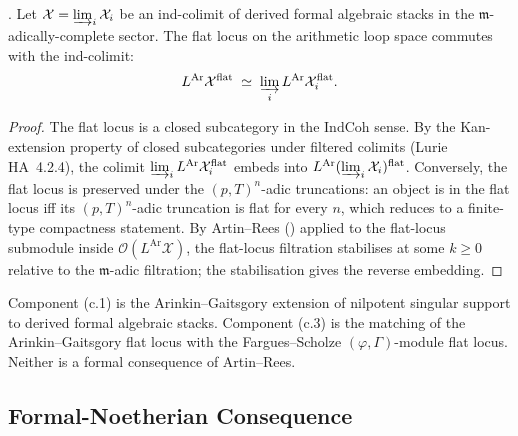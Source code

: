 \begin{proposition}
\label{v4-arith:w5-i:prop:c2-closure}
\ClaimStatusProvedHere. Let \(\mathcal{X}=\varinjlim_{i}\mathcal{X}_{i}\)
be an ind-colimit of derived formal algebraic stacks in the
\(\mathfrak{m}\)-adically-complete sector. The flat locus on the
arithmetic loop space commutes with the ind-colimit:
\[
L^{\mathrm{Ar}}\mathcal{X}^{\mathrm{flat}}\;\simeq\;\varinjlim_{i}L^{\mathrm{Ar}}\mathcal{X}_{i}^{\mathrm{flat}}.
\]
\end{proposition}

\begin{proof}
The flat locus is a closed subcategory in the \(\mathrm{IndCoh}\)
sense. By the Kan-extension property of closed subcategories under
filtered colimits (Lurie HA~4.2.4), the colimit
\(\varinjlim_{i}L^{\mathrm{Ar}}\mathcal{X}_{i}^{\mathrm{flat}}\)
embeds into \(L^{\mathrm{Ar}}(\varinjlim_{i}\mathcal{X}_{i})^{\mathrm{flat}}\).
Conversely, the flat locus is preserved under the \((p,T)^{n}\)-adic
truncations: an object is in the flat locus iff its
\((p,T)^{n}\)-adic truncation is flat for every \(n\), which reduces to
a finite-type compactness statement. By Artin--Rees
() applied to the flat-locus
submodule inside \(\mathcal{O}(L^{\mathrm{Ar}}\mathcal{X})\), the
flat-locus filtration stabilises at some \(k\geq 0\) relative to the
\(\mathfrak{m}\)-adic filtration; the stabilisation gives the reverse
embedding.
\end{proof}

\begin{remark}
\label{v4-arith:w5-i:rem:c1-c3-open}
Component (c.1) is the Arinkin--Gaitsgory extension of nilpotent
singular support to derived formal algebraic stacks. Component (c.3)
is the matching of the Arinkin--Gaitsgory flat locus with the
Fargues--Scholze \((\varphi,\Gamma)\)-module flat locus. Neither is a
formal consequence of Artin--Rees.
\end{remark}

\subsection{Formal-Noetherian Consequence}
\label{v4-arith:w5-i:formal-conclusion}

